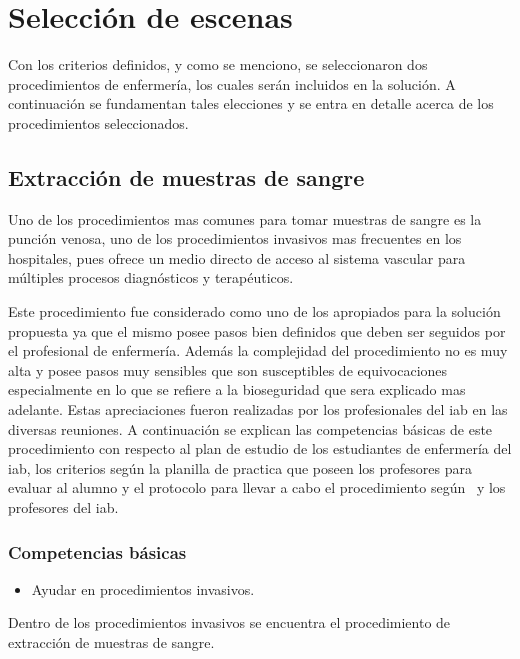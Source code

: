 \section{Selección de escenas}
\label{sec:seleccion_escenas}

Con los criterios definidos, y como se menciono, se seleccionaron dos
procedimientos de enfermería, los cuales serán incluidos en la solución. A
continuación se fundamentan tales elecciones y se entra en detalle acerca de los
procedimientos seleccionados.

\subsection{Extracción de muestras de sangre}

Uno de los procedimientos mas comunes para tomar muestras de sangre es la
punción venosa, uno de los procedimientos invasivos mas frecuentes en los
hospitales, pues ofrece un medio directo de acceso al sistema vascular para
múltiples procesos diagnósticos y terapéuticos.

Este procedimiento fue considerado como uno de los apropiados para la solución
propuesta ya que el mismo posee pasos bien definidos que deben ser seguidos por
el profesional de enfermería. Además la complejidad del procedimiento no es muy
alta y posee pasos muy sensibles que son susceptibles de equivocaciones
especialmente en lo que se refiere a la bioseguridad que sera explicado mas
adelante. Estas apreciaciones fueron realizadas por los profesionales del
\Gls{iab} en las diversas reuniones. A continuación se explican las competencias
básicas de este procedimiento con respecto al plan de estudio de los estudiantes
de enfermería del \Gls{iab}, los criterios según la planilla de practica que
poseen los profesores para evaluar al alumno y el protocolo para llevar a cabo
el procedimiento según~\cite{oms:extraccion} y los profesores del \Gls{iab}.

\subsubsection{Competencias básicas}
\begin{itemize}
\item Ayudar en procedimientos invasivos.
\end{itemize}

Dentro de los procedimientos invasivos se encuentra el procedimiento de
extracción de muestras de sangre.

